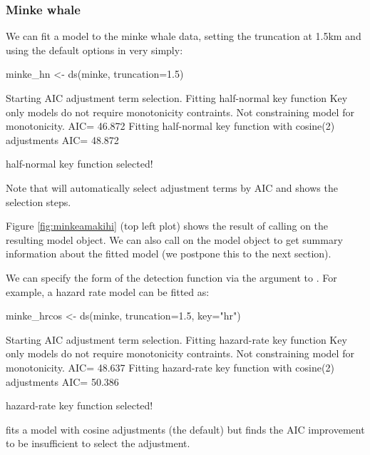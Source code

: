 \documentclass[article]{jss}
\begin{document}
\subsubsection{Minke whale}\label{minke-whale}

We can fit a model to the minke whale data, setting the truncation at
1.5km and using the default options in  very simply:

\begin{CodeChunk}
\begin{CodeInput}
minke_hn <- ds(minke, truncation=1.5)
\end{CodeInput}
\begin{CodeOutput}
Starting AIC adjustment term selection.
Fitting half-normal key function
Key only models do not require monotonicity contraints. Not constraining model for monotonicity.
AIC= 46.872
Fitting half-normal key function with cosine(2) adjustments
AIC= 48.872


half-normal key function selected!
\end{CodeOutput}
\end{CodeChunk}

Note that  will automatically select adjustment terms by AIC
and shows the selection steps.

Figure \ref{fig:minkeamakihi} (top left plot) shows the result of
calling  on the resulting model object. We can also call
 on the model object to get summary information about the
fitted model (we postpone this to the next section).

We can specify the form of the detection function via the 
argument to . For example, a hazard rate model can be fitted
as:

\begin{CodeChunk}
\begin{CodeInput}
minke_hrcos <- ds(minke, truncation=1.5, key="hr")
\end{CodeInput}
\begin{CodeOutput}
Starting AIC adjustment term selection.
Fitting hazard-rate key function
Key only models do not require monotonicity contraints. Not constraining model for monotonicity.
AIC= 48.637
Fitting hazard-rate key function with cosine(2) adjustments
AIC= 50.386


hazard-rate key function selected!
\end{CodeOutput}
\end{CodeChunk}

 fits a model with cosine adjustments (the default) but finds
the AIC improvement to be insufficient to select the adjustment.
\end{document}
